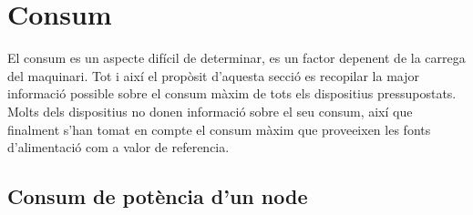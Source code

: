 \section{Consum}

El consum es un aspecte difícil de determinar, es un factor depenent de la carrega del maquinari. Tot i així el propòsit d’aquesta secció es recopilar la major informació possible sobre el consum màxim de tots els dispositius pressupostats. Molts dels dispositius no donen informació sobre el seu consum, així que finalment s'han tomat en compte el consum màxim que proveeixen les fonts d'alimentació com a valor de referencia.

\subsection{Consum de potència d'un node}

